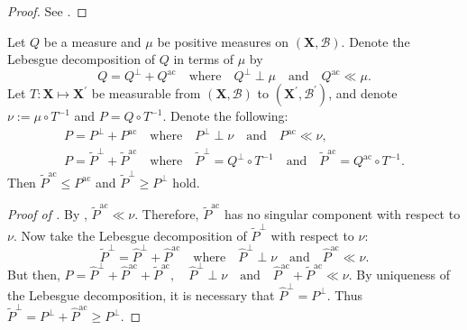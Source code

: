 \begin{proof}
See .
\end{proof}

\begin{lemma}
\label{lem--leb-decomp-pseudo-ineqs}
Let \(Q\) be a measure and \(\mu\) be positive measures on \((\mathbf{X},
\mathcal{B})\).
Denote the Lebesgue decomposition of \(Q\) in terms of \(\mu\) by
\begin{equation*}
  Q = Q^{\perp} + Q^{\mathrm{ac}} \quad \text{where} \quad Q^{\perp} \perp \mu
  \quad \text{and} \quad Q^{\mathrm{ac}} \ll \mu.
\end{equation*}
Let \(T : \mathbf{X} \mapsto \mathbf{X}^{\prime}\) be measurable from
\((\mathbf{X}, \mathcal{B})\) to \(\left( \mathbf{X}^{\prime},
\mathcal{B}^{\prime} \right)\), and denote \(\nu := \mu \circ T^{- 1}\) and
\(P = Q \circ T^{- 1}\).
Denote the following:
\begin{equation*}
  \begin{gathered}
    P = P^{\perp} + P^{\mathrm{ac}} \quad \text{where} \quad P^{\perp} \perp \nu
    \quad \text{and} \quad P^{\mathrm{ac}} \ll \nu, \\
    P = \tilde{P}^{\perp} + \tilde{P}^{\mathrm{ac}}
    \quad \text{where} \quad
    \tilde{P}^{\perp} = Q^{\perp} \circ T^{- 1} \quad \text{and} \quad
    \tilde{P}^{\mathrm{ac}} = Q^{\mathrm{ac}} \circ T^{- 1}.
  \end{gathered}
\end{equation*}
Then \(\tilde{P}^{\mathrm{ac}} \leq P^{\mathrm{ac}}\) and \(\tilde{P}^{\perp}
\geq P^{\perp}\) hold.
\end{lemma}

\begin{proof}[Proof of ]
By , \(\tilde{P}^{\mathrm{ac}} \ll \nu\).
Therefore, \(\tilde{P}^{\mathrm{ac}}\) has no singular component with respect to
\(\nu\).
Now take the Lebesgue decomposition of \(\tilde{P}^{\perp}\) with respect to
\(\nu\):
\begin{equation*}
  \tilde{P}^{\perp} = \hat{P}^{\perp} + \hat{P}^{\mathrm{ac}} \quad \text{where}
  \quad \hat{P}^{\perp} \perp \nu \quad \text{and} \quad \hat{P}^{\mathrm{ac}}
  \ll \nu.
\end{equation*}
But then, \(P = \hat{P}^{\perp} + \hat{P}^{\mathrm{ac}} +
\tilde{P}^{\mathrm{ac}}, \quad \hat{P}^{\perp} \perp \nu \quad \text{and} \quad
\hat{P}^{\mathrm{ac}} + \tilde{P}^{\mathrm{ac}} \ll \nu\).
By uniqueness of the Lebesgue decomposition, it is necessary that
\(\hat{P}^{\perp} = P^{\perp}\).
Thus \(\tilde{P}^{\perp} = P^{\perp} + \hat{P}^{\mathrm{ac}} \geq P^{\perp}\).
\end{proof}

